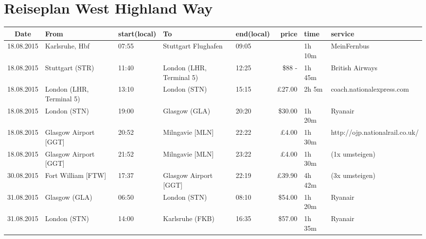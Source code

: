 \documentclass[a4paper, landscape]{scrartcl}
\begin{document}
\clearpage
\section*{Reiseplan West Highland Way}
\vspace*{\fill}
    \begin{table}[ht]
        \centering
        \begin{tabular}{cl p{2cm} l p{2cm} rl p{5cm}}
        \toprule
    \textbf{Date}  & \textbf{From}              & \textbf{start\newline (local)} & \textbf{To} & \textbf{end\newline (local)} & \textbf{price} & \textbf{time} & \textbf{service} \\ \midrule
    18.08.2015 & Karlsruhe, Hbf           & 07:55          & Stuttgart Flughafen      & 09:05        & \EUR 5.00      & 1h 10m & MeinFernbus      \\
    18.08.2015 & Stuttgart (STR)          & 11:40          & London (LHR, Terminal 5) & 12:25        & \$88 - \EUR 100.00 & 1h 45m & British Airways \\
    18.08.2015 & London (LHR, Terminal 5) & 13:10          & London (STN)             & 15:15        &   £27.00       & 2h 5m  & coach.nationalexpress.com           \\
    18.08.2015 & London (STN)             & 19:00          & Glasgow (GLA)            & 20:20        &  \$30.00       & 1h 20m & Ryanair                             \\
    18.08.2015 & Glasgow Airport [GGT]    & 20:52          & Milngavie [MLN]          & 22:22        &    £4.00       & 1h 30m & http://ojp.nationalrail.co.uk/      \\
    18.08.2015 & Glasgow Airport [GGT]    & 21:52          & Milngavie [MLN]          & 23:22        &    £4.00       & 1h 30m & (1x umsteigen)                      \\\midrule\midrule
    30.08.2015 & Fort William [FTW]       & 17:37          & Glasgow Airport [GGT]    & 22:19        &   £39.90       & 4h 42m & (3x umsteigen)                      \\
    31.08.2015 & Glasgow (GLA)            & 06:50          & London (STN)             & 08:10        &  \$54.00       & 1h 20m & Ryanair                             \\
    31.08.2015 & London (STN)             & 14:00          & Karlsruhe (FKB)          & 16:35        &  \$57.00       & 1h 35m & Ryanair                             \\%

\end{tabular}
\end{table}
\end{document}
